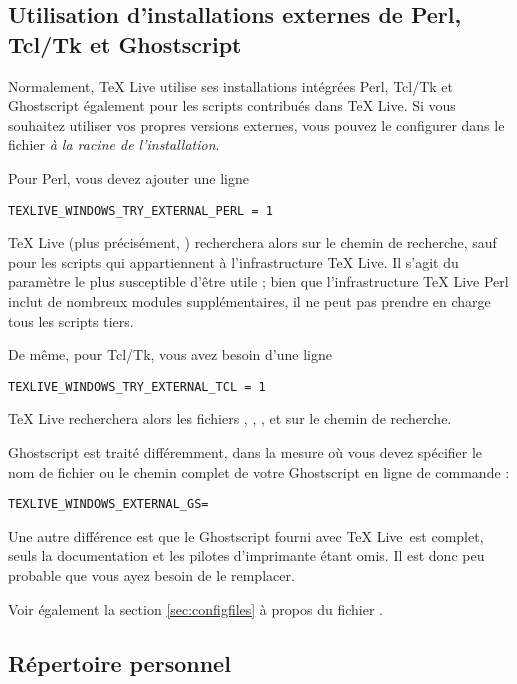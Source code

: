 \documentclass[german, english, french, 12pt]{article}
\renewcommand{\TL}{\TeX{} Live\xspace}%
\begin{document}
\subsection{Utilisation d'installations externes de Perl, Tcl/Tk et Ghostscript}
\label{sec:externalwndws}

Normalement, \TL{} utilise ses installations intégrées Perl, Tcl/Tk et
Ghostscript également pour les scripts contribués dans \TL. Si vous souhaitez
utiliser vos propres versions externes, vous pouvez le configurer dans le
fichier  \emph{à la racine de l'installation}.

Pour Perl, vous devez ajouter une ligne
\begin{verbatim}
TEXLIVE_WINDOWS_TRY_EXTERNAL_PERL = 1
\end{verbatim}
\TL{} (plus précisément, ) recherchera alors
 sur le chemin de recherche, sauf pour les scripts qui
appartiennent à l'infrastructure \TL{}. Il s'agit du paramètre le plus
susceptible d'être utile ; bien que l'infrastructure \TL{} Perl inclut de
nombreux modules supplémentaires, il ne peut pas prendre en charge tous les
scripts tiers.

De même, pour Tcl/Tk, vous avez besoin d'une ligne
\begin{verbatim}
TEXLIVE_WINDOWS_TRY_EXTERNAL_TCL = 1
\end{verbatim}
\TL{} recherchera alors les fichiers , ,
,  et  sur le chemin de
recherche.

Ghostscript est traité différemment, dans la mesure où vous devez spécifier le
nom de fichier ou le chemin complet de votre Ghostscript en ligne de commande :
\begin{alltt}
TEXLIVE_WINDOWS_EXTERNAL_GS = 
\end{alltt}
Une autre différence est que le Ghostscript fourni avec \TL\ est complet, seuls
la documentation et les pilotes d'imprimante étant omis.  Il est donc peu
probable que vous ayez besoin de le remplacer.

Voir également la section \ref{sec:configfiles} à propos du fichier .

\subsection{Répertoire personnel}
\label{sec:winhome}
\end{document}
